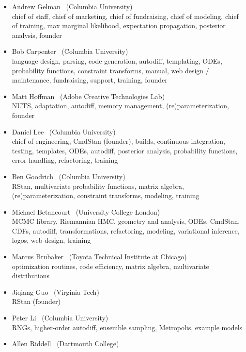\begin{itemize}
\item Andrew Gelman \ (Columbia University)
\\ {\footnotesize chief of staff, chief of marketing, chief of
  fundraising, chief of modeling, chief of training, max marginal
  likelihood, expectation propagation, posterior analysis, founder}
\item Bob Carpenter \ (Columbia University) \\ {\footnotesize language
    design, parsing, code generation, autodiff, templating, ODEs,
    probability functions, constraint transforms, manual, web design /
    maintenance, fundraising, support, training, founder}
\item Matt Hoffman \ (Adobe Creative Technologies Lab)
\\ {\footnotesize NUTS, adaptation, autodiff, memory management,
  (re)parameterization, founder}
\item Daniel Lee \   (Columbia University)
\\ {\footnotesize chief of engineering, CmdStan (founder), builds, continuous
  integration, testing, templates, ODEs, autodiff,
  posterior analysis, probability functions, error handling, refactoring, training}
\item Ben Goodrich \   (Columbia University)
\\ {\footnotesize RStan, multivariate probability functions, matrix algebra,
  (re)parameterization, constraint transforms, modeling, training}
\item Michael Betancourt \ (University College London) \\
  {\footnotesize MCMC library, Riemannian HMC, geometry and analysis,
    ODEs, CmdStan, CDFs, autodiff, transformations, refactoring, modeling,
    variational inference, logos, web design, training}
\item Marcus Brubaker \   (Toyota Technical Institute at Chicago)
\\ {\footnotesize optimization routines, code efficiency, matrix
  algebra, multivariate distributions}
\item Jiqiang Guo \   (Virginia Tech)
\\ {\footnotesize RStan (founder)}
\item Peter Li \   (Columbia University)
\\ {\footnotesize RNGs, higher-order autodiff, ensemble sampling,
  Metropolis, example models}
\item Allen Riddell \   (Dartmouth College)

\end{itemize}
